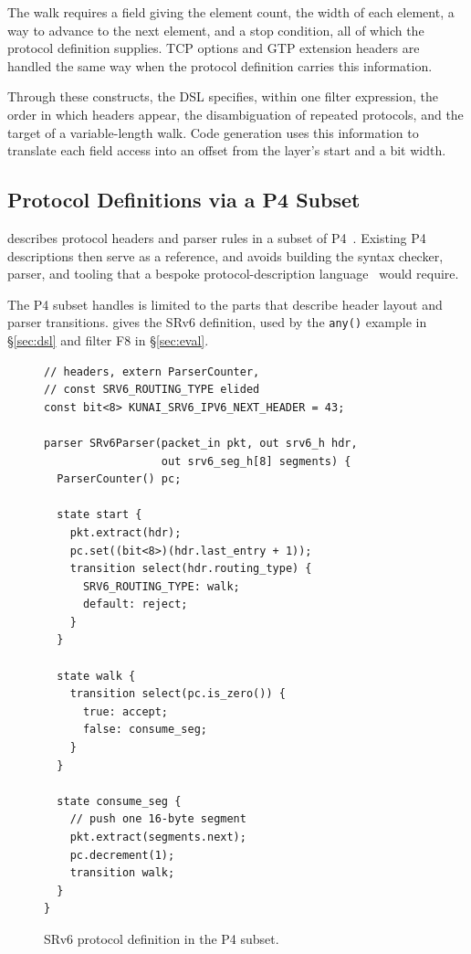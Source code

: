 The walk requires a field giving the
element count, the width of each element, a way to advance to the next
element, and a stop condition, all of which the protocol definition
supplies. TCP options and GTP extension headers are handled the same
way when the protocol definition carries this information.

Through these constructs, the \kunai DSL specifies, within one filter
expression, the order in which headers appear, the disambiguation of
repeated protocols, and the target of a variable-length walk. Code generation
uses this information to translate each field access into an offset
from the layer's start and a bit width.

\subsection{Protocol Definitions via a P4 Subset}
\label{sec:p4subset}

\kunai describes protocol headers and parser rules in a subset of
P4~\cite{p4spec,doenges2021petr4,bosshart2014p4}. Existing P4
descriptions then serve as a reference, and \kunai avoids building the
syntax checker, parser, and tooling that a bespoke protocol-description
language~\cite{mccann2000packettypes,pang2006binpac} would require.

The P4 subset \kunai handles is limited to the parts that describe
header layout and parser transitions.  gives the
SRv6 definition, used by the \texttt{any()} example in \S\ref{sec:dsl}
and filter F8 in \S\ref{sec:eval}.

\begin{figure}[t]
\begin{lstlisting}[basicstyle=\scriptsize\ttfamily,breaklines=true,columns=fullflexible]
// headers, extern ParserCounter,
// const SRV6_ROUTING_TYPE elided
const bit<8> KUNAI_SRV6_IPV6_NEXT_HEADER = 43;

parser SRv6Parser(packet_in pkt, out srv6_h hdr,
                  out srv6_seg_h[8] segments) {
  ParserCounter() pc;

  state start {
    pkt.extract(hdr);
    pc.set((bit<8>)(hdr.last_entry + 1));
    transition select(hdr.routing_type) {
      SRV6_ROUTING_TYPE: walk;
      default: reject;
    }
  }

  state walk {
    transition select(pc.is_zero()) {
      true: accept;
      false: consume_seg;
    }
  }

  state consume_seg {
    // push one 16-byte segment
    pkt.extract(segments.next);
    pc.decrement(1);
    transition walk;
  }
}
\end{lstlisting}
\caption{SRv6 protocol definition in the \kunai P4 subset.}
\label{fig:p4srv6}
\end{figure}

